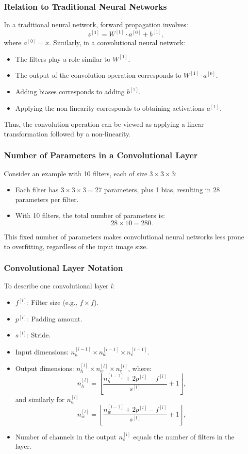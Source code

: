 \documentclass[letterpaper,12pt,notitlepage,twoside]{report}
\begin{document}
\subsubsection*{Relation to Traditional Neural Networks}
In a traditional neural network, forward propagation involves:
\[
z^{[1]} = W^{[1]} \cdot a^{[0]} + b^{[1]},
\]
where \( a^{[0]} = x \). Similarly, in a convolutional neural network:
\begin{itemize}[nosep]
    \item The filters play a role similar to \( W^{[1]} \).
    \item The output of the convolution operation corresponds to \( W^{[1]} \cdot a^{[0]} \).
    \item Adding biases corresponds to adding \( b^{[1]} \).
    \item Applying the non-linearity corresponds to obtaining activations \( a^{[1]} \).
\end{itemize}
Thus, the convolution operation can be viewed as applying a linear transformation followed by a non-linearity.

\subsubsection*{Number of Parameters in a Convolutional Layer}
Consider an example with 10 filters, each of size \( 3 \times 3 \times 3 \):
\begin{itemize}
    \item Each filter has \( 3 \times 3 \times 3 = 27 \) parameters, plus 1 bias, resulting in \( 28 \) parameters per filter.
    \item With 10 filters, the total number of parameters is:
    \[
    28 \times 10 = 280.
    \]
\end{itemize}

This fixed number of parameters makes convolutional neural networks less prone to overfitting, regardless of the input image size.

\subsubsection*{Convolutional Layer Notation}
To describe one convolutional layer \( l \):
\begin{itemize}[nosep]
    \item \( f^{[l]} \): Filter size (e.g., \( f \times f \)).
    \item \( p^{[l]} \): Padding amount.
    \item \( s^{[l]} \): Stride.
    \item Input dimensions: \( n_h^{[l-1]} \times n_w^{[l-1]} \times n_c^{[l-1]} \).
    \item Output dimensions: \( n_h^{[l]} \times n_w^{[l]} \times n_c^{[l]} \), where:
    \[
    n_h^{[l]} = \left\lfloor \frac{n_h^{[l-1]} + 2p^{[l]} - f^{[l]}}{s^{[l]}} + 1 \right\rfloor,
    \]
    and similarly for \( n_w^{[l]} \)
    \[
    n_w^{[l]} = \left\lfloor \frac{n_w^{[l-1]} + 2p^{[l]} - f^{[l]}}{s^{[l]}} + 1 \right\rfloor,
    \]
    \item Number of channels in the output \( n_c^{[l]} \) equals the number of filters in the layer.
\end{itemize}
\end{document}
